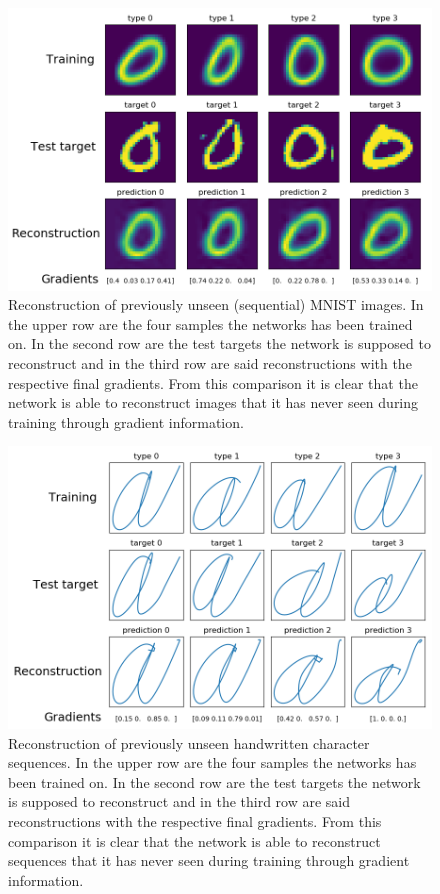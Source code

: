 \documentclass{article}
\begin{document}
\begin{figure}[!htb]
	\centering
	\includegraphics[width=\textwidth]{images/MNIST_IC.png}
	\caption{Reconstruction of previously unseen (sequential) MNIST images. In the upper row are the four samples the networks has been trained on. In the second row are the test targets the network is supposed to reconstruct and in the third row are said reconstructions with the respective final gradients. From this comparison it is clear that the network is able to reconstruct images that it has never seen during training through gradient information.}
	\label{fig:unseen_fit_MNIST}
\end{figure}

\begin{figure}[!htb]
	\centering
	\includegraphics[width=\textwidth]{images/chars_IC.png}
	\caption{Reconstruction of previously unseen handwritten character sequences. In the upper row are the four samples the networks has been trained on. In the second row are the test targets the network is supposed to reconstruct and in the third row are said reconstructions with the respective final gradients. From this comparison it is clear that the network is able to reconstruct sequences that it has never seen during training through gradient information.}
	\label{fig:unseen_fit_chars}
\end{figure}
\end{document}
